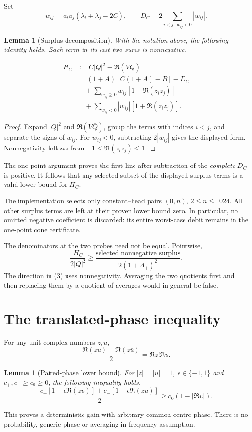 \documentclass[11pt,a4paper]{article}
\newtheorem{lemma}[theorem]{Lemma}
\begin{document}
Set
\[
 w_{ij}=a_i a_j(\lambda_i+\lambda_j-2C),\qquad
 D_C=2\sum_{i<j,\ w_{ij}<0}|w_{ij}|.
\]
\begin{lemma}[Surplus decomposition]\label{lem:surplus}
With the notation above, the following identity holds. Each term in its
last two sums is nonnegative.

\[
\begin{split}
 H_C&:=C|Q|^2-\Re(V\overline Q)\\
 &=(1+A)[C(1+A)-B]-D_C\\
 &\quad+\sum_{w_{ij}\ge0}w_{ij}[1-\Re(z_i\overline z_j)]\\
 &\quad+\sum_{w_{ij}<0}|w_{ij}|[1+\Re(z_i\overline z_j)].
\end{split}\tag{2}
\]
\end{lemma}
\begin{proof}
Expand $|Q|^2$ and $\Re(V\overline Q)$, group the terms with indices $i<j$,
and separate the signs of $w_{ij}$. For $w_{ij}<0$, subtracting
$2|w_{ij}|$ gives the displayed form. Nonnegativity follows from
$-1\le\Re(z_i\overline z_j)\le1$.
\end{proof}
The one-point argument proves the first
line after subtraction of the \emph{complete} \(D_C\) is positive. It follows that
any selected subset of the displayed surplus terms is a valid lower bound
for \(H_C\).

The implementation selects only constant--head pairs \((0,n)\),
\(2\le n\le1024\). All other surplus terms are left at their proven lower
bound zero. In particular, no omitted negative coefficient is discarded:
its entire worst-case debit remains in the one-point cone certificate.

The denominators at the two probes need not be equal. Pointwise,
\[
 \frac{H_C}{2|Q|^2}\ge
 \frac{\text{selected nonnegative surplus}}{2(1+A_+)^2}.
 \tag{3}
\]
The direction in (3) uses nonnegativity. Averaging the two quotients first and
then replacing them by a quotient of averages would in general be false.

\section{The translated-phase inequality}\label{why-two-translated-sources-cannot-both-saturate-these-terms}

For any unit complex numbers \(z,u\),
\[
 \frac{\Re(zu)+\Re(z\overline u)}2=\Re z\,\Re u.
\]
\begin{lemma}[Paired-phase lower bound]\label{lem:paired}
For $|z|=|u|=1$, $\epsilon\in\{-1,1\}$ and
$c_+,c_-\ge c_0\ge0$, the following inequality holds.
\[
\frac{c_+[1-\epsilon\Re(zu)]
+c_-[1-\epsilon\Re(z\overline u)]}{2}
\ge c_0(1-|\Re u|).
\tag{4}
\]
\end{lemma}
This proves a deterministic gain with arbitrary common centre phase. There
is no probability, generic-phase or averaging-in-frequency assumption.
\end{document}
